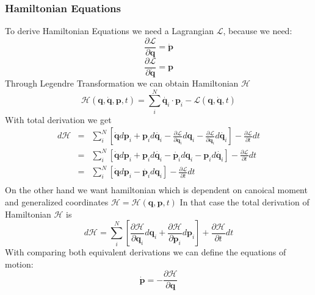 \subsubsection{Hamiltonian Equations}
To derive Hamiltonian Equations we need a Lagrangian $\mathcal{L}$, because we need:
\begin{equation}
	\frac{\partial\mathcal{L}}{\partial \mathbf{q}} = \dot{\mathbf{p}}
\end{equation}
\begin{equation}
	\frac{\partial\mathcal{L}}{\partial \dot{\mathbf{q}}} = \mathbf{p}
\end{equation}
Through Legendre Transformation we can obtain Hamiltonian $\mathcal{H}$
\begin{equation}
	\mathcal{H}(\mathbf{q},\dot{\mathbf{q}},\mathbf{p},t) = \sum_i^N  \dot{\mathbf{q}_i} \cdot \mathbf{p}_i -\mathcal{L}(\mathbf{q},\dot{\mathbf{q}},t)
\end{equation}
With total derivation\cite{ham} we get
\begin{eqnarray}
	d\mathcal{H} &=& \sum_i^N\left[ \dot{\mathbf{q}} d\mathbf{p}_i +  \mathbf{p}_i d\dot{\mathbf{q}_i} - \frac{\partial\mathcal{L}}{\partial \mathbf{q}_i} d\mathbf{q}_i - \frac{\partial\mathcal{L}}{\partial \dot{\mathbf{q}_i}} d\dot{\mathbf{q}_i}\right] - \frac{\partial\mathcal{L}}{\partial t} dt\\ 
	&=& \sum_i^N\left[ \dot{\mathbf{q}} d\mathbf{p}_i +  \mathbf{p}_i d\dot{\mathbf{q}_i} - \dot{\mathbf{p}_i} d\mathbf{q}_i - \mathbf{p}_i d\dot{\mathbf{q}_i}\right] - \frac{\partial\mathcal{L}}{\partial t} dt\\
	&=&\sum_i^N\left[ \dot{\mathbf{q}} d\mathbf{p}_i  - \dot{\mathbf{p}_i} d\mathbf{q}_i\right] - \frac{\partial\mathcal{L}}{\partial t} dt\\
\end{eqnarray}
On the other hand we want hamiltonian which is dependent on canoical moment and generalized coordinates $\mathcal{H}=\mathcal{H}(\mathbf{q},\mathbf{p},t)$
In that case the total derivation of Hamiltonian $\mathcal{H}$ is
\begin{equation}
	d\mathcal{H} = \sum_i^N\left[\frac{\partial \mathcal{H}}{\partial \mathbf{q}_i}d\mathbf{q}_i + \frac{\partial \mathcal{H}}{\partial \mathbf{p}_i}d\mathbf{p}_i\right] + \frac{\partial\mathcal{H}}{\partial t} dt
\end{equation}
With comparing both equivalent derivations we can define the equations of motion:
\begin{equation}
	\dot{\mathbf{p}} = -\frac{\partial \mathcal{H}}{\partial \mathbf{q}}
\end{equation}
